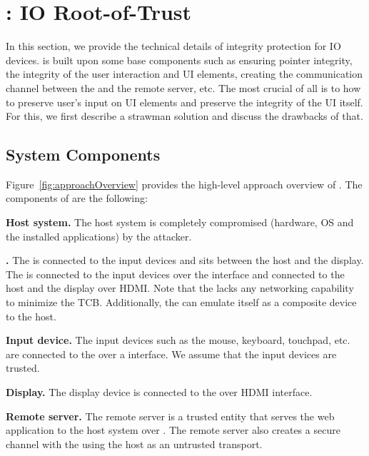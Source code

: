 \section{\name: IO Root-of-Trust}
\label{sec:systemDesign}


In this section, we provide the technical details of \name integrity protection for IO devices. \name is built upon some base components such as ensuring pointer integrity, the integrity of the user interaction and UI elements, creating the communication channel between the \device and the remote server, etc. The most crucial of all is to how to preserve user's input on UI elements and preserve the integrity of the UI itself. For this, we first describe a strawman solution and discuss the drawbacks of that.   

\iffalse
\subsection{System Components}
\label{sec:systemDesign:components}

Figure~\ref{fig:approachOverview} provides the high-level approach overview of \name. The components of \name are the following:

\begin{mylist}
  \item \textbf{Host system.} The host system is completely compromised (hardware, OS and the installed applications) by the attacker.
  \item \textbf{\device.} The \device is connected to the input devices and sits between the host and the display. The \device is connected to the input devices over the \usb interface and connected to the host and the display over HDMI. Note that the \device lacks any networking capability to minimize the TCB. Additionally, the \device can emulate itself as a composite \usb device to the host.
  \item \textbf{Input device.} The input devices such as the mouse, keyboard, touchpad, etc. are connected to the \device over a \usb interface. We assume that the input devices are trusted.
  \item \textbf{Display.} The display device is connected to the \device over HDMI interface.
  \item \textbf{Remote server.} The remote server is a trusted entity that serves the web application to the host system over \http. The remote server also creates a secure channel with the \device using the host as an untrusted transport. 
  
\end{mylist}

